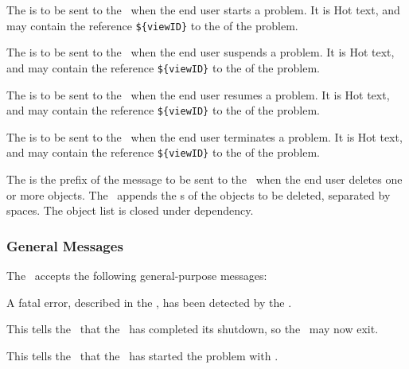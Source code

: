
The  is to be sent to the \SM\ when the end user starts
a problem.  It is {\sf Hot} text, and may contain the reference
{\tt\$\{viewID\}} to the  of the problem.


The  is to be sent to the \SM\ when the end user
suspends a problem.  It is {\sf Hot} text, and may contain the reference
{\tt\$\{viewID\}} to the  of the problem.


The  is to be sent to the \SM\ when the end user resumes
a problem.  It is {\sf Hot} text, and may contain the reference
{\tt\$\{viewID\}} to the  of the problem.


The  is to be sent to the \SM\ when the end user terminates
a problem.  It is {\sf Hot} text, and may contain the reference
{\tt\$\{viewID\}} to the  of the problem.


The  is the prefix of the message to be sent to the \SM\
when the end user deletes one or more objects. The \FE\ appends the
\marg{objectID}s of the objects to be deleted, separated by
spaces. The object list is closed under dependency.


\subsubsection{General Messages}\label{general_msgs}

The \FE\ accepts the following general-purpose messages:


A fatal error, described in the , has been detected by
the \SM.


This tells the \FE\ that the \SM\ has completed its shutdown, so
the \FE\ may now exit.


This tells the \FE\ that the \SM\ has started the problem with
.

